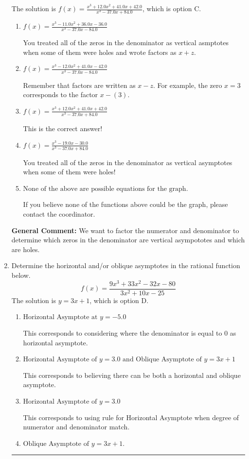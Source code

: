 \documentclass{extbook}[14pt]
\newcommand{\litem}[1]{\item #1

\rule{\textwidth}{0.4pt}}
\begin{document}
\begin{enumerate}
{The solution is \( f(x)=\frac{x^{3} +12.0 x^{2} +41.0 x + 42.0}{x^{3} -37.0 x + 84.0} \), which is option C.\begin{enumerate}[label=\Alph*.]
\item \( f(x)=\frac{x^{3} -11.0 x^{2} +36.0 x -36.0}{x^{3} -37.0 x -84.0} \)

You treated all of the zeros in the denominator as vertical asmptotes when some of them were holes and wrote factors as $x+z$.
\item \( f(x)=\frac{x^{3} -12.0 x^{2} +41.0 x -42.0}{x^{3} -37.0 x -84.0} \)

Remember that factors are written as $x-z$. For example, the zero $x=3$ corresponds to the factor $x-(3)$.
\item \( f(x)=\frac{x^{3} +12.0 x^{2} +41.0 x + 42.0}{x^{3} -37.0 x + 84.0} \)

This is the correct answer!
\item \( f(x)=\frac{x^{3} -19.0 x -30.0}{x^{3} -37.0 x + 84.0} \)

You treated all of the zeros in the denominator as vertical asymptotes when some of them were holes!
\item \( \text{None of the above are possible equations for the graph.} \)

If you believe none of the functions above could be the graph, please contact the coordinator.
\end{enumerate}

\textbf{General Comment:} We want to factor the numerator and denominator to determine which zeros in the denominator are vertical asympototes and which are holes.
}
\litem{
Determine the horizontal and/or oblique asymptotes in the rational function below.
\[ f(x) = \frac{9x^{3} +33 x^{2} -32 x -80}{3x^{2} +10 x -25} \]The solution is \( y = 3x + 1 \), which is option D.\begin{enumerate}[label=\Alph*.]
\item \( \text{Horizontal Asymptote at } y = -5.0 \)

This corresponds to considering where the denominator is equal to 0 as horizontal asymptote.
\item \( \text{Horizontal Asymptote of } y = 3.0 \text{ and Oblique Asymptote of } y = 3x + 1 \)

This corresponds to believing there can be both a horizontal and oblique asymptote.
\item \( \text{Horizontal Asymptote of } y = 3.0  \)

This corresponds to using rule for Horizontal Asymptote when degree of numerator and denominator match.
\item \( \text{Oblique Asymptote of } y = 3x + 1. \)


\end{enumerate}}
\end{enumerate}
\end{document}
